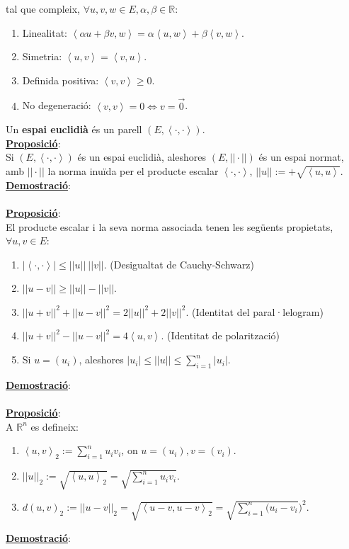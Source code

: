 \documentclass[11pt]{article}
\newcommand{\undbf}[1]{\underline{\textbf{#1}}:\\}
\newcommand{\prop}{\undbf{Proposició}}
\newcommand{\dem}{\undbf{Demostració}}
\newcommand{\dotpr}[2]{\left< #1,#2\right>}
\begin{document}
tal que compleix, $\forall u,v,w\in E,\alpha,\beta\in\mathbb{R}$:
\begin{enumerate}
	\item Linealitat: $\dotpr{\alpha u+\beta v}{w}=\alpha\dotpr{u}{w}+\beta\dotpr{v}{w}$.
	\item Simetria: $\dotpr{u}{v}=\dotpr{v}{u}$.
	\item Definida positiva: $\dotpr{v}{v}\geq0$.
	\item No degeneració: $\dotpr{v}{v}=0\iff v=\vec{0}$.
\end{enumerate}
Un \textbf{espai euclidià} és un parell $(E,\dotpr{\cdot}{\cdot})$.\\
\prop Si $(E,\dotpr{\cdot}{\cdot})$ és un espai euclidià, aleshores $(E,||\cdot||)$ és un espai normat, amb $||\cdot||$ la norma inuïda per el producte escalar $\left<\cdot,\cdot\right>$, $||u||:=+\sqrt{\left<u,u\right>}$.\\
\dem \\
\prop El producte escalar i la seva norma associada tenen les següents propietats, $\forall u,v\in E$:
\begin{enumerate}
	\item $|\left<\cdot,\cdot\right>|\leq||u||\ ||v||$. (Desigualtat de Cauchy-Schwarz)
	\item $||u-v||\geq||u||-||v||$.
	\item $||u+v||^2+||u-v||^2=2||u||^2+2||v||^2$. (Identitat del paral·lelogram)
	\item $||u+v||^2-||u-v||^2=4\left<u,v\right>$. (Identitat de polarització)
	\item Si $u=(u_i)$, aleshores $|u_i|\leq||u||\leq\sum_{i=1}^n|u_i|$.
\end{enumerate}
\dem \\
\prop A $\mathbb{R}^n$ es defineix:
\begin{enumerate}
	\item $\left<u,v\right>_2:=\sum_{i=1}^nu_iv_i$, on $u=(u_i),v=(v_i)$.
	\item $||u||_2:=\sqrt{\left<u,u\right>_2}=\sqrt{\sum_{i=1}^nu_iv_i}$.
	\item $d(u,v)_2:=||u-v||_2=\sqrt{\left<u-v,u-v\right>_2}=\sqrt{\sum_{i=1}^n(u_i-v_i})^2$.
\end{enumerate}
\dem \\
\end{document}
